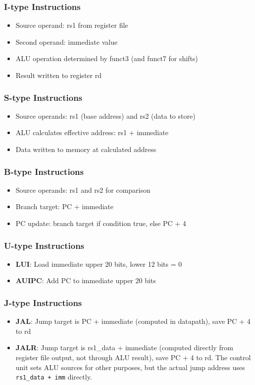 \subsubsection{I-type Instructions}
\begin{itemize}
    \item Source operand: rs1 from register file
    \item Second operand: immediate value
    \item ALU operation determined by funct3 (and funct7 for shifts)
    \item Result written to register rd
\end{itemize}

\subsubsection{S-type Instructions}
\begin{itemize}
    \item Source operands: rs1 (base address) and rs2 (data to store)
    \item ALU calculates effective address: rs1 + immediate
    \item Data written to memory at calculated address
\end{itemize}

\subsubsection{B-type Instructions}
\begin{itemize}
    \item Source operands: rs1 and rs2 for comparison
    \item Branch target: PC + immediate
    \item PC update: branch target if condition true, else PC + 4
\end{itemize}

\subsubsection{U-type Instructions}
\begin{itemize}
    \item \textbf{LUI}: Load immediate upper 20 bits, lower 12 bits = 0
    \item \textbf{AUIPC}: Add PC to immediate upper 20 bits
\end{itemize}

\subsubsection{J-type Instructions}
\begin{itemize}
    \item \textbf{JAL}: Jump target is PC + immediate (computed in datapath), save PC + 4 to rd
    \item \textbf{JALR}: Jump target is rs1\_data + immediate (computed directly from register file output, not through ALU result), save PC + 4 to rd. The control unit sets ALU sources for other purposes, but the actual jump address uses \texttt{rs1\_data + imm} directly.
\end{itemize}

